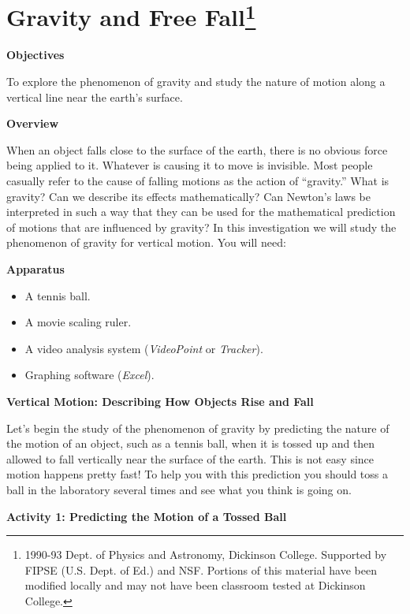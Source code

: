 
\section{Gravity and Free Fall\footnote{
1990-93 Dept. of Physics and Astronomy, Dickinson College. Supported by FIPSE
(U.S. Dept. of Ed.) and NSF. Portions of this material have been modified locally
and may not have been classroom tested at Dickinson College.
}}

\makelabheader %

\textbf{Objectives }

To explore the phenomenon of gravity and study the nature of motion along a
vertical line near the earth's surface.

\textbf{Overview }

When an object falls close to the surface of the earth, there is no obvious
force being applied to it. Whatever is causing it to move is invisible. Most
people casually refer to the cause of falling motions as the action of 
``gravity.''
What is gravity? Can we describe its effects mathematically? Can Newton's laws
be interpreted in such a way that they can be used for the mathematical prediction
of motions that are influenced by gravity? In this investigation we will study
the phenomenon of gravity for vertical motion. You will need:

\textbf{Apparatus}

\begin{itemize}
\item A tennis ball. 
\item A movie scaling ruler.
\item A video analysis system (\textit{VideoPoint} or \textit{Tracker}). 
\item Graphing software (\textit{Excel}).
\end{itemize}
\textbf{Vertical Motion: Describing How Objects Rise and Fall }

Let's begin the study of the phenomenon of gravity by predicting the nature
of the motion of an object, such as a tennis ball, when it is tossed up and
then allowed to fall vertically near the surface of the earth. This is not easy
since motion happens pretty fast! To help you with this prediction you should
toss a ball in the laboratory several times and see what you think is going
on.

\textbf{Activity 1: Predicting the Motion of a Tossed Ball }

